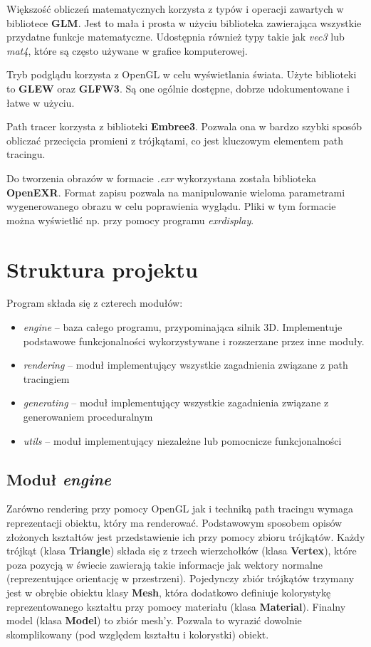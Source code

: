 \documentclass[inz,shortabstract]{iithesis}
\begin{document}
        Większość obliczeń matematycznych korzysta z typów i operacji zawartych w bibliotece \textbf{GLM}. Jest to mała i prosta w użyciu biblioteka zawierająca wszystkie przydatne funkcje matematyczne. Udostępnia również typy takie jak \textit{vec3} lub \textit{mat4}, które są często używane w grafice komputerowej. 
        
        Tryb podglądu korzysta z OpenGL w celu wyświetlania świata. Użyte biblioteki to \textbf{GLEW} oraz \textbf{GLFW3}. Są one ogólnie dostępne, dobrze udokumentowane i łatwe w użyciu. 
        
        Path tracer korzysta z biblioteki \textbf{Embree3}. Pozwala ona w bardzo szybki sposób obliczać przecięcia promieni z trójkątami, co jest kluczowym elementem path tracingu. 
        
        Do tworzenia obrazów w formacie \textit{.exr} wykorzystana została biblioteka \textbf{OpenEXR}. Format zapisu pozwala na manipulowanie wieloma parametrami wygenerowanego obrazu w celu poprawienia wyglądu. 
        Pliki w tym formacie można wyświetlić np. przy pomocy programu \textit{exrdisplay}.
        
    \section{Struktura projektu}
        Program składa się z czterech modułów:
        \begin{itemize}
            \item \textit{engine} -- baza całego programu, przypominająca silnik 3D. Implementuje podstawowe funkcjonalności wykorzystywane i rozszerzane przez inne moduły. 
            \item \textit{rendering} -- moduł implementujący wszystkie zagadnienia związane z path tracingiem
            \item \textit{generating} -- moduł implementujący wszystkie zagadnienia związane z generowaniem proceduralnym
            \item \textit{utils} -- moduł implementujący niezależne lub pomocnicze funkcjonalności
        \end{itemize}
        
        \subsection{Moduł \textit{engine}}
            Zarówno rendering przy pomocy OpenGL jak i techniką path tracingu wymaga reprezentacji obiektu, który ma renderować. Podstawowym sposobem opisów złożonych kształtów jest przedstawienie ich przy pomocy zbioru trójkątów. Każdy trójkąt (klasa \textbf{Triangle}) składa się z trzech wierzchołków (klasa \textbf{Vertex}), które poza pozycją w świecie zawierają takie informacje jak wektory normalne (reprezentujące orientację w przestrzeni). Pojedynczy zbiór trójkątów trzymany jest w obrębie obiektu klasy \textbf{Mesh}, która dodatkowo definiuje kolorystykę reprezentowanego kształtu przy pomocy materiału (klasa \textbf{Material}). Finalny model (klasa \textbf{Model}) to zbiór mesh'y. Pozwala to wyrazić dowolnie skomplikowany (pod względem kształtu i kolorystki) obiekt. 
            
\end{document}
